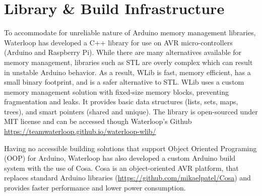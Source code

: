 \documentclass[main.tex]{subfiles}
\begin{document}
    \section{Library \& Build Infrastructure}
    To accommodate for unreliable nature of Arduino memory management libraries, Waterloop has developed a C++ library for use on AVR micro-controllers (Arduino and Raspberry Pi). While there are many alternatives available for memory management, libraries such as STL are overly complex which can result in unstable Arduino behavior. As a result, WLib is fast, memory efficient, has a small binary footprint, and is a safer alternative to STL. WLib uses a custom memory management solution with fixed-size memory blocks, preventing fragmentation and leaks. It provides basic data structures (lists, sets, maps, trees), and smart pointers (shared and unique). The library is open-sourced under MIT license and can be accessed though Waterloop's Github \url{https://teamwaterloop.github.io/waterloop-wlib/}

    Having no accessible building solutions that support Object Oriented Programing (OOP) for Arduino, Waterloop has also developed a custom Arduino build system with the use of Cosa. Cosa is an object-oriented AVR platform, that replaces standard Arduino libraries (\url{https://github.com/mikaelpatel/Cosa}) and provides faster performance and lower power consumption.
    
\end{document}
